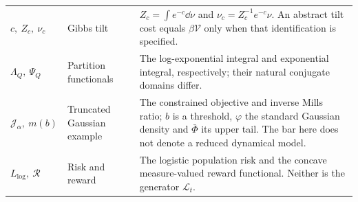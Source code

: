 \begin{longtable}{@{}>{\raggedright\arraybackslash}p{32mm}>{\raggedright\arraybackslash}p{26mm}>{\raggedright\arraybackslash}p{90mm}@{}}
$c,\ Z_c,\ \nu_c$ & Gibbs tilt & $Z_c=\int e^{-c}\dd\nu$ and $\nu_c=Z_c^{-1}e^{-c}\nu$. An abstract tilt cost equals $\beta\mathcal V$ only when that identification is specified.\\[3pt]
$\Lambda_Q,\ \Psi_Q$ & Partition functionals & The log-exponential integral and exponential integral, respectively; their natural conjugate domains differ.\\[3pt]
$\mathcal J_\alpha,\ m(b)$ & Truncated Gaussian example & The constrained objective and inverse Mills ratio; $b$ is a threshold, $\varphi$ the standard Gaussian density and $\bar\Phi$ its upper tail. The bar here does not denote a reduced dynamical model.\\[3pt]
$L_{\mathrm{log}},\ \mathcal R$ & Risk and reward & The logistic population risk and the concave measure-valued reward functional. Neither is the generator $\mathcal L_t$.\\[3pt]
\end{longtable}
\addtocounter{table}{-1}
\endgroup

